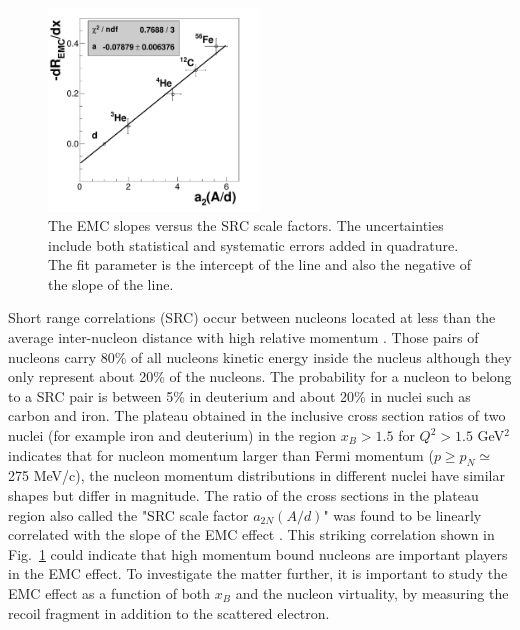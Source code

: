 \begin{figure}[tb]
  \begin{center}
    \includegraphics[angle=0, width=0.5\textwidth]{./fig-intro/Slope}
    \caption{The EMC slopes versus the SRC scale factors.  The uncertainties include both statistical and systematic errors added in quadrature.  The fit parameter is the intercept of the line and also the negative of the slope of the line.}
    \label{fig:src-emc}
  \end{center}
\end{figure}

Short range correlations (SRC) occur between nucleons located at less than the average inter-nucleon distance with high relative momentum \cite{Frankfurt:1993sp, Egiyan:2003vg, Egiyan:2005hs}. Those pairs of nucleons carry 80\% of all nucleons kinetic energy inside the nucleus although they only represent about 20\% of the nucleons. The probability for a nucleon to belong to a SRC pair is between 5\% in deuterium and about 20\% in nuclei such as carbon and iron.  The plateau obtained in the inclusive cross section ratios of two nuclei (for example iron and deuterium) in the region $x_B > 1.5$ for $Q^2 > 1.5$ GeV$^2$ indicates that for nucleon momentum larger than Fermi momentum ($p\geqslant p_{N} \simeq$ 275 MeV/c), the nucleon momentum distributions in different nuclei have similar shapes but differ in magnitude. The ratio of the cross sections in the plateau region also called the "SRC scale factor $a_{2N}(A/d)$" was found to be linearly correlated with the slope of the EMC effect \cite{Weinstein:2010rt}. This striking correlation shown in Fig.~\ref{fig:src-emc} could indicate that high momentum bound nucleons are important players in the EMC effect. To investigate the matter further, it is important to study the EMC effect as a function of both $x_B$ and the nucleon virtuality, by measuring the recoil fragment in addition to the scattered electron. 

